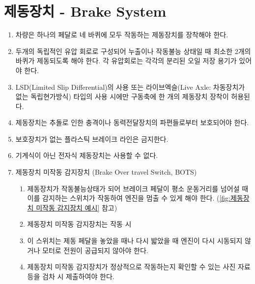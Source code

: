 \documentclass[final,a4paper,10pt]{report}
\begin{document}
\section{제동장치 - Brake System}
\begin{enumerate}
  \item 차량은 하나의 페달로 네 바퀴에 모두 작동하는 제동장치를 장착해야 한다.
  \item 두개의 독립적인 유압 회로로 구성되어 누출이나 작동불능 상태일 때 최소한 2개의 바퀴가 제동되도록 해야 한다. 각 유압회로는 각각의 분리된 오일 저장 용기가 있어야 한다.
  \item LSD(Limited Slip Differential)의 사용 또는 라이브엑슬(Live Axle: 차동장치가 없는 독립현가방식) 타입의 사용 시에만 구동축에 한 개의 제동장치 장착이 허용된다.
  \item 제동장치는 추돌로 인한 충격이나 동력전달장치의 파편들로부터 보호되어야 한다.
  \item 보호장치가 없는 플라스틱 브레이크 라인은 금지한다.
  \item 기계식이 아닌 전자식 제동장치는 사용할 수 없다.
  
  \item 제동장치 미작동 감지장치 (Brake Over travel Switch, BOTS)
    \begin{enumerate}
      \item 제동장치가 작동불능상태가 되어 브레이크 페달이 평소 운동거리를 넘어설 때 이를 감지하는 스위치가 작동하여 엔진을 멈출 수 있게 해야 한다. (\cref{fig:제동장치 미작동 감지장치 예시} 참고)
      
      \item 제동장치 미작동 감지장치는 작동 시
        
      \item 이 스위치는 제동 페달을 놓았을 때나 다시 밟았을 때 엔진이 다시 시동되지 않거나 모터로 전원이 공급되지 않아야 한다.
      \item 제동장치 미작동 감지장치가 정상적으로 작동하는지 확인할 수 있는 사진 자료 등을 검차 시 제출하여야 한다.
    \end{enumerate}
    

\end{enumerate}
\end{document}
